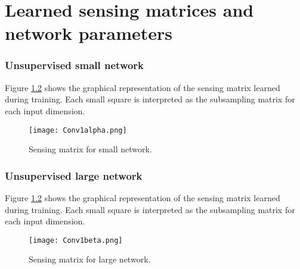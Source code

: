 \appendix
\chapter{Learned sensing matrices and network parameters}
\subsection{Unsupervised small network}

Figure \ref{fig:Phial} shows the graphical representation of the sensing matrix learned during training. Each small square is interpreted as the subsampling matrix for each input dimension.

\begin{figure}[!htb] 
\vspace{1cm}
\centering 
\texttt{[image: Conv1alpha.png]}
\caption[Learned sensing matrix for small network]{Sensing matrix for small network.}
\label{fig:Phial} 
\end{figure} 

\FloatBarrier


\subsection{Unsupervised large network}

Figure \ref{fig:Phial} shows the graphical representation of the sensing matrix learned during training. Each small square is interpreted as the subsampling matrix for each input dimension.

\begin{figure}[!htb] 
\vspace{1cm}
\centering 
\texttt{[image: Conv1beta.png]}
\caption[Learned sensing matrix for large network]{Sensing matrix for large network.}
\label{fig:Phial} 
\end{figure} 

